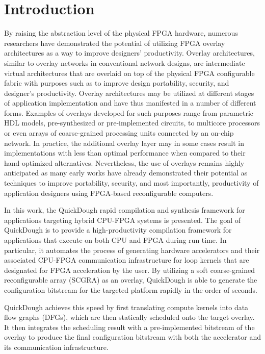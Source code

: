 \section{Introduction}\label{sec:introduction}

By raising the abstraction level of the physical FPGA hardware, numerous researchers have demonstrated the potential of utilizing FPGA overlay architectures as a way to improve designers' productivity\cite{Lebedev2010,kissler2006dynamically,unnikrishnan2009application,Yiannacouras2009FPS,Guy2012VENICE,Jeffrey2011potential}.
Overlay architectures, similar to overlay networks in conventional network designs, are intermediate virtual architectures that are overlaid on top of the physical FPGA configurable fabric with purposes such as to improve design portability, security, and designer's productivity.
Overlay architectures may be utilized at different stages of application implementation and have thus manifested in a number of different forms.
Examples of overlays developed for such purposes range from parametric HDL models, pre-synthesized or pre-implemented circuits, to multicore processors or even arrays of coarse-grained processing units connected by an on-chip network.
In practice, the additional overlay layer may in some cases result in implementations with less than optimal performance when compared to their hand-optimized alternatives.
Nevertheless, the use of overlays remains highly anticipated as many early works have already demonstrated their potential as techniques to improve portability, security, and most importantly, productivity of application designers using FPGA-based reconfigurable computers.

In this work, the QuickDough rapid compilation and synthesis framework for applications targeting hybrid CPU-FPGA systems is presented.  The goal of QuickDough is to provide a high-productivity compilation framework for applications that execute on both CPU and FPGA during run time.
In particular, it automates the process of generating hardware accelerators and their associated CPU-FPGA communication infrastructure for loop kernels that are designated for FPGA acceleration by the user.
By utilizing a soft coarse-grained reconfigurable array (SCGRA) as an overlay, QuickDough is able to generate the configuration bitstream for the targeted platform rapidly in the order of seconds.

QuickDough achieves this speed by first translating compute kernels into data flow graphs (DFGs), which are then statically scheduled onto the target overlay.
It then integrates the scheduling result with a pre-implemented bitstream of the overlay to produce the final configuration bitstream with both the accelerator and its communication infrastructure.

